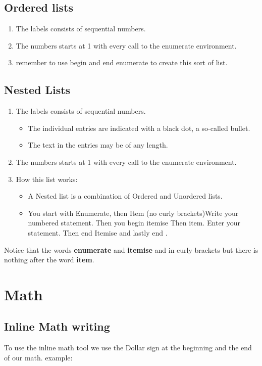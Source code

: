 \documentclass[12pt,a4paper]{article}
\begin{document}
\subsection{Ordered lists}

\begin{enumerate}
\item The labels consists of sequential numbers.
\item The numbers starts at 1 with every call to the enumerate environment.
\item remember to use begin and end enumerate to create this sort of list. 
\end{enumerate}

\subsection{Nested Lists}

\begin{enumerate}
 \item The labels consists of sequential numbers.
 \begin{itemize}
 \item The individual entries are indicated with a black dot, a so-called bullet.
 \item The text in the entries may be of any length.
 \end{itemize}
 \item The numbers starts at 1 with every call to the enumerate environment.
 \item How this list works: 
 \begin{itemize}
 \item A Nested list is a combination of Ordered and Unordered lists. 
 \item You start with Enumerate, then Item (no curly brackets)Write your numbered statement. Then you begin itemise 
 Then item. Enter your statement. Then end Itemise and lastly end .
 \end{itemize}
\end{enumerate}
Notice that the words \textbf{enumerate} and \textbf{itemise} and in curly brackets but there is nothing after the word \textbf{item}.

\section{Math}
\subsection{Inline Math writing}
To use the inline math tool we use the Dollar sign at the beginning and the end of our math. example:
\end{document}

